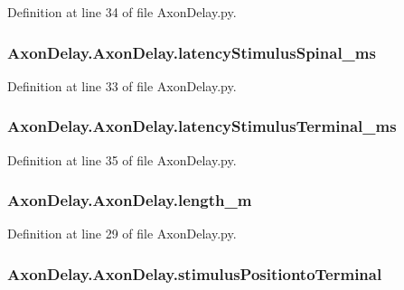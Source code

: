 Definition at line 34 of file Axon\-Delay.\-py.

\hypertarget{class_axon_delay_1_1_axon_delay_a81ea09febed911b8f5e4d56a5f434f8d}{
\subsubsection[{latency\-Stimulus\-Spinal\-\_\-ms}]{\setlength{\rightskip}{0pt plus 5cm}Axon\-Delay.\-Axon\-Delay.\-latency\-Stimulus\-Spinal\-\_\-ms}}\label{class_axon_delay_1_1_axon_delay_a81ea09febed911b8f5e4d56a5f434f8d}


Definition at line 33 of file Axon\-Delay.\-py.

\hypertarget{class_axon_delay_1_1_axon_delay_a88845b9926b97db88174ce088d5af5e0}{
\subsubsection[{latency\-Stimulus\-Terminal\-\_\-ms}]{\setlength{\rightskip}{0pt plus 5cm}Axon\-Delay.\-Axon\-Delay.\-latency\-Stimulus\-Terminal\-\_\-ms}}\label{class_axon_delay_1_1_axon_delay_a88845b9926b97db88174ce088d5af5e0}


Definition at line 35 of file Axon\-Delay.\-py.

\hypertarget{class_axon_delay_1_1_axon_delay_a08ab7285929002db2108179ea9f5d5dd}{
\subsubsection[{length\-\_\-m}]{\setlength{\rightskip}{0pt plus 5cm}Axon\-Delay.\-Axon\-Delay.\-length\-\_\-m}}\label{class_axon_delay_1_1_axon_delay_a08ab7285929002db2108179ea9f5d5dd}


Definition at line 29 of file Axon\-Delay.\-py.

\hypertarget{class_axon_delay_1_1_axon_delay_a3f6bb8f38c4474806544d01fbe9c0361}{
\subsubsection[{stimulus\-Positionto\-Terminal}]{\setlength{\rightskip}{0pt plus 5cm}Axon\-Delay.\-Axon\-Delay.\-stimulus\-Positionto\-Terminal}}\label{class_axon_delay_1_1_axon_delay_a3f6bb8f38c4474806544d01fbe9c0361}


